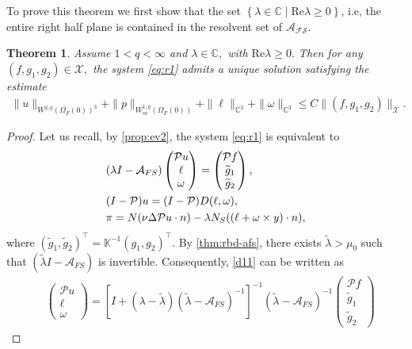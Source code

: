 \documentclass[12pt,a4paper,reqno]{amsart}
\newtheorem{theorem}{Theorem}[section]
\theoremstyle{definition}
\theoremstyle{remark}
\numberwithin{equation}{section}
\newcommand{\ofo}{\Omega_{F}(0)}
\newcommand{\ct}{\mathbb{C}^{3}}
\newcommand{\mx}{\mathcal{X}}
\newcommand{\mpp}{\mathcal{P}}
\begin{document}
To prove this theorem we first show that the set $\left\{ \lambda \in \mathbb{C} \mid\mathrm{Re} \lambda \geqslant 0 \right\}$, i.e, the entire right half plane is contained in the resolvent set of $\mathcal{A_{FS}}$.


\begin{theorem}  \label{th:dd}
Assume $1 < q < \infty$ and $\lambda \in \mathbb{C},$ with $\mathrm{Re} \lambda \geqslant 0.$ Then for any $(f,g_{1},g_{2}) \in \mx,$
the system \eqref{eq:r1} admits a unique solution satisfying the estimate
 \begin{align} \label{est:00}
 \|u\|_{W^{2,q}(\ofo)^{3}} + \|p\|_{W^{1,q}_{m}(\ofo)} + \|\ell\|_{\ct} + \|\omega\|_{\ct} \leqslant C \|(f,g_{1},g_{2})\|_{\mx}.
 \end{align}
\end{theorem}
\begin{proof}
Let us recall, by \cref{prop:ev2}, the  system \eqref{eq:r1}  is equivalent to
\begin{align} \label{d11}
&(\lambda I - \mathcal{A}_{FS}) \begin{pmatrix}
\mpp u \\ \ell \\ \omega
\end{pmatrix} = \begin{pmatrix}
\mpp f \\ \widetilde g_{1} \\ \widetilde g_{2}
\end{pmatrix}, \notag  \\
&(I - \mpp) u = (I - \mpp) D (\ell,\omega ),  \\
&\pi = N (\nu \Delta \mpp u \cdot n) - \lambda N_{S} ((\ell + \omega \times y) \cdot n), \notag
\end{align}
where $(\widetilde g_{1}, \widetilde g_{2})^{\top}  = \mathbb{K}^{-1}(g_{1},g_{2})^{\top}.$
By \cref{thm:rbd-afs},  there exists $\widetilde \lambda > \mu_{0}$ such that $(\widetilde \lambda I  - \mathcal{A}_{FS})$ is invertible. Consequently,  \eqref{d11} can be written as
\begin{align}
&\begin{pmatrix} \label{d12}
\mpp u \\ \ell \\ \omega
\end{pmatrix}  = \left[ I + (\lambda - \widetilde\lambda) (\widetilde\lambda - \mathcal{A}_{FS} )^{-1}\right]^{-1}  \left(\widetilde\lambda - \mathcal{A}_{FS} \right)^{-1} \begin{pmatrix}
\mpp f \\ \widetilde g_{1} \\ \widetilde g_{2}

\end{pmatrix}
\end{align}
\end{proof}
\end{document}
